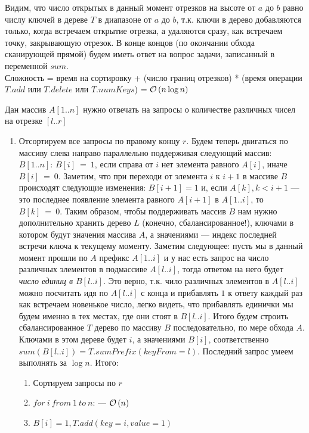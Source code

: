 Видим, что число открытых в данный момент отрезков на высоте от $a$ до $b$ равно числу ключей в дереве $T$ в диапазоне от $a$ до $b$, т.к. ключи в дерево добавляются только, когда встречаем открытие отрезка, а удаляются сразу, как встречаем точку, закрывающую отрезок.
В конце концов (по окончании обхода сканирующей прямой) будем иметь ответ на вопрос задачи, записанный в переменной $sum$.\\
Сложность = время на сортировку + (число границ отрезков) * (время операции $T.add$ или $T.delete$ или $T.numKeys$) = $\mathcal{O}\left(n\log{n}\right)$ \xqed


Дан массив $A[1..n]$ нужно отвечать на запросы о количестве различных чисел на отрезке $[l..r]$
\begin{enumerate}[label=(\alph*)]
\item Отсортируем все запросы по правому концу $r$. Будем теперь двигаться по массиву слева направо параллельно
поддерживая следующий массив: $B[1..n]$: $B[i]~=~1$, если справа от $i$ нет элемента равного $A[i]$, иначе $B[i]~=~0$. Заметим, что при переходи от элемента $i$ к $i+1$ в массиве $B$ происходят следующие изменения: $B[i+1] = 1$ и, если $A[k], k < i + 1$ --- это последнее появление элемента равного $A[i+1]$ в $A[1..i]$, то $B[k]~=~0$. Таким образом, чтобы поддерживать массив $B$ нам нужно дополнительно хранить дерево $L$ (конечно, сбалансированное!), ключами в котором будут значения массива $A$, а значениями --- индекс последней встречи ключа к текущему моменту. Заметим следующее: пусть мы в данный момент прошли по $A$ префикс $A[1..i]$ и у нас
есть запрос на число различных элементов в подмассиве $A[l..i]$, тогда ответом на него будет \emph{число единиц в $B[l..i]$}. Это верно, т.к. чило различных элементов в $A[l..i]$ можно посчитать идя по $A[l..i]$ с конца и прибавлять $1$ к ответу каждый раз как встречаем новенькое число, легко видеть, что прибавлять единички мы будем именно в тех местах, где они стоят в $B[l..i]$.
Итого будем строить сбалансированное $T$ дерево по массиву $B$ последовательно, по мере обхода $A$. Ключами в этом дереве будет $i$, а значениями $B[i]$, соответственно $sum(B[l..i]) = T.sumPrefix(keyFrom = l)$. Последний запрос умеем выполнять за $\log{n}$.
Итого:
\begin{enumerate}
	\item Сортируем запросы по $r$
	\item $for\ i\ from\ 1\ to\ n$: --- $\mathcal{O}\left(n\right)$
	\item $B[i] = 1, T.add(key = i, value = 1)$ \\

\end{enumerate}
\end{enumerate}
